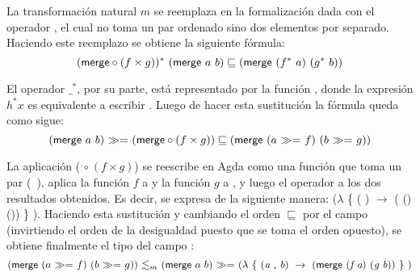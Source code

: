 La transformación natural $m$ se reemplaza en la formalización dada con el operador , el cual no toma un par ordenado sino dos elementos por separado. Haciendo este reemplazo se obtiene la siguiente fórmula:
\begin{equation*}
(\AgdaField{merge} \circ (f \times g))^* \ (\AgdaField{merge}\ a\ b) \sqsubseteq (\AgdaField{merge}\ (f^*\ a)\ (g^*\ b))
\end{equation*}

El operador $\_^*$, por su parte, está representado por la función \AgdaField{$\gg=$}, donde la expresión $h^* x$ es equivalente a escribir  \AgdaField{$\gg=$} . Luego de hacer esta sustitución la fórmula queda como sigue:
\begin{equation*}
(\AgdaField{merge}\ a\ b) \ \AgdaField{$\gg=$} \ (\AgdaField{merge} \circ (f \times g)) \sqsubseteq (\AgdaField{merge} \ (a\ \AgdaField{$\gg=$}\ f) \ (b\ \AgdaField{$\gg=$}\ g))
\end{equation*}

La aplicación ( $\circ \ (f \times g)$) se reescribe en Agda como una función que toma un par \hbox{( \AgdaInductiveConstructor{,} )}, aplica la función $f$ a  y la función $g$ a , y luego el operador  a los dos resultados obtenidos. Es decir, se expresa de la siguiente manera: ($\lambda$ \{ ( \AgdaInductiveConstructor{,} ) $\rightarrow$ ( () ()) \} ). Haciendo esta sustitución y cambiando el orden $\sqsubseteq$ por el campo  (invirtiendo el orden de la desigualdad puesto que se toma el orden opuesto), se obtiene finalmente el tipo del campo :
\begin{equation*}
(\AgdaField{merge} \ (a\ \AgdaField{$\gg=$}\ f) \ (b\ \AgdaField{$\gg=$}\ g)) \ \AgdaField{$\lesssim_m$} \ (\AgdaField{merge}\ a\ b) \ \AgdaField{$\gg=$} \ (\lambda\  \{\ (\AgdaBound{a} \ \AgdaInductiveConstructor{,} \ \AgdaBound{b}) \ \rightarrow \ (\AgdaField{merge} \ (\AgdaBound{f a}) \ (\AgdaBound{g b})) \ \}\ ) 
\end{equation*}
